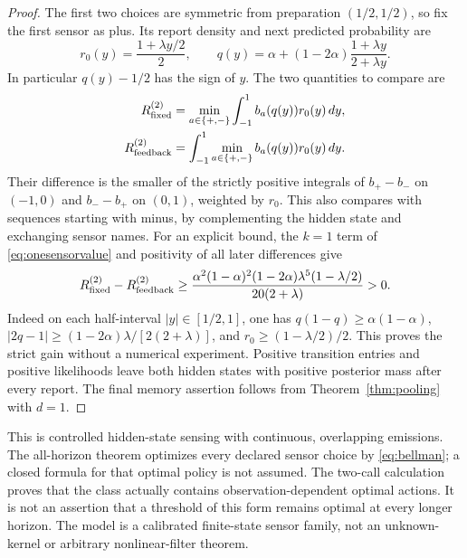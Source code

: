 \begin{proof}
The first two choices are symmetric from preparation $(1/2,1/2)$, so fix the first sensor as plus. Its report density and next predicted probability are
\[
 r_0(y)=\frac{1+\lambda y/2}{2},\qquad
 q(y)=\alpha+(1-2\alpha)\frac{1+\lambda y}{2+\lambda y}.
\]
In particular $q(y)-1/2$ has the sign of $y$. The two quantities to compare are
\begin{align}
 R_{\rm fixed}^{(2)}&=\min_{a\in\{+,-\}}\int_{-1}^1b_a(q(y))r_0(y)\,dy,
                 \label{eq:fixedtwosensors}\\
 R_{\rm feedback}^{(2)}&=\int_{-1}^1\min_{a\in\{+,-\}}b_a(q(y))r_0(y)\,dy.
                 \label{eq:feedbacktwosensors}
\end{align}
Their difference is the smaller of the strictly positive integrals of $b_+-b_-$ on $(-1,0)$ and $b_--b_+$ on $(0,1)$, weighted by $r_0$. This also compares with sequences starting with minus, by complementing the hidden state and exchanging sensor names. For an explicit bound, the $k=1$ term of \eqref{eq:onesensorvalue} and positivity of all later differences give
\[
 R_{\rm fixed}^{(2)}-R_{\rm feedback}^{(2)}
 \ge\frac{\alpha^2(1-\alpha)^2(1-2\alpha)\lambda^5(1-\lambda/2)}{20(2+\lambda)}>0.
\]
Indeed on each half-interval $|y|\in[1/2,1]$, one has $q(1-q)\ge\alpha(1-\alpha)$,
$|2q-1|\ge(1-2\alpha)\lambda/[2(2+\lambda)]$, and $r_0\ge(1-\lambda/2)/2$. This proves the strict gain without a numerical experiment. Positive transition entries and positive likelihoods leave both hidden states with positive posterior mass after every report. The final memory assertion follows from Theorem~\ref{thm:pooling} with $d=1$.
\end{proof}

This is controlled hidden-state sensing with continuous, overlapping emissions. The all-horizon theorem optimizes every declared sensor choice by \eqref{eq:bellman}; a closed formula for that optimal policy is not assumed. The two-call calculation proves that the class actually contains observation-dependent optimal actions. It is not an assertion that a threshold of this form remains optimal at every longer horizon. The model is a calibrated finite-state sensor family, not an unknown-kernel or arbitrary nonlinear-filter theorem.
